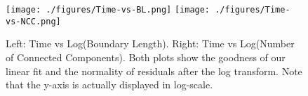 \documentclass{llncs}
\begin{document}
\begin{figure}[t]
    \centering
    \texttt{[image: ./figures/Time-vs-BL.png]}
    \texttt{[image: ./figures/Time-vs-NCC.png]}
    \caption{Left: Time vs Log(Boundary Length). Right: Time vs Log(Number of Connected Components). Both plots show the goodness of our linear fit and the normality of residuals after the log transform. Note that the y-axis is actually displayed in log-scale.}
    \label{fig:pred_label_time}
    \vspace*{-0.3cm}
\end{figure}


\vspace*{-0.1cm}
\end{document}
